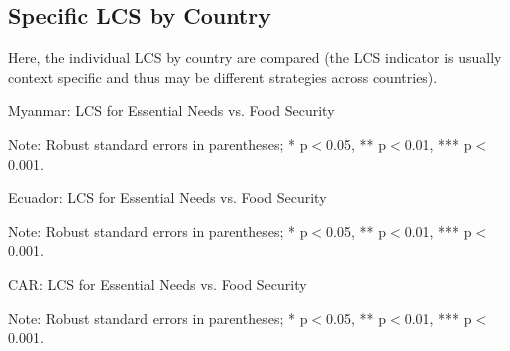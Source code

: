 \documentclass[11pt,harvard]{article}
\begin{document}
\pagebreak

\subsection{Specific LCS by Country}

Here, the individual LCS by country are compared (the LCS indicator is usually context specific and thus may be different strategies across countries).

\begin{table}[htbp]
	\centering
	\begin{adjustbox}{max width=\textwidth}
		\begin{threeparttable}
			\caption{Myanmar: LCS for Essential Needs vs. Food Security}
			\scriptsize
			 
			\label{tab:LCS_F2F_EN_FS_Myanmar}
			\begin{tablenotes}
				\item Note: Robust standard errors in parentheses; * p$<$0.05, ** p$<$0.01, *** p$<$0.001. 
			\end{tablenotes}
		\end{threeparttable}
	\end{adjustbox}
\end{table}


\begin{table}[htbp]
	\centering
	\begin{adjustbox}{max width=\textwidth}
		\begin{threeparttable}
			\caption{Ecuador: LCS for Essential Needs vs. Food Security}
			\scriptsize
			 
			\label{tab:LCS_F2F_EN_FS_Ecuador}
			\begin{tablenotes}
				\item Note: Robust standard errors in parentheses; * p$<$0.05, ** p$<$0.01, *** p$<$0.001. 
			\end{tablenotes}
		\end{threeparttable}
	\end{adjustbox}
\end{table}


\begin{table}[htbp]
	\centering
	\begin{adjustbox}{max width=\textwidth}
		\begin{threeparttable}
			\caption{CAR: LCS for Essential Needs vs. Food Security}
			\scriptsize
			 
			\label{tab:LCS_F2F_EN_FS_CAR}
			\begin{tablenotes}
				\item Note: Robust standard errors in parentheses; * p$<$0.05, ** p$<$0.01, *** p$<$0.001. 
			\end{tablenotes}
		\end{threeparttable}
	\end{adjustbox}
\end{table}
\end{document}

